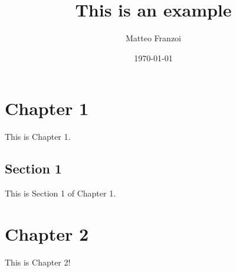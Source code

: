 \documentclass{book}
\author{Matteo Franzoi}
\date{\today}
\title{This is an example}
\begin{document}
\maketitle
\chapter{Chapter 1}
This is Chapter 1.
\section{Section 1}
This is Section 1 of Chapter 1.
\chapter{Chapter 2}
This is Chapter 2!
\end{document}
